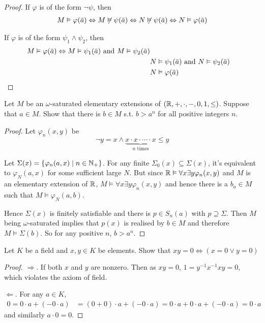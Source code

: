 \documentclass[11pt]{article}
\begin{document}
\begin{proof}
If \(\varphi\) is of the form \(\neg\psi\), then
\begin{align*}
M\vDash\varphi(\bara)\Leftrightarrow M\not\vDash\psi(\bara)\Leftrightarrow N\not\vDash\psi(\bara)\Leftrightarrow N\vDash\varphi(\bara)
\end{align*}

If \(\varphi\) is of the form \(\psi_1\wedge\psi_2\), then
\begin{align*}
M\vDash\varphi(\bara)\Leftrightarrow M\vDash\psi_1(\bara)\text{ and }M\vDash\psi_2(\bara)\\
&N\vDash\psi_1(\bara)\text{ and }N\vDash\psi_2(\bara)\\
&N\vDash\varphi(\bara)
\end{align*}
\end{proof}

\begin{exercise}
Let \(M\) be an \(\omega\)-saturated elementary extensions of \((\mathbb{R},+,\cdot,-,0,1,\le)\). Suppose that \(a\in M\).
Show that there is \(b\in M\) s.t. \(b>a^n\) for all positive integers \(n\).
\end{exercise}

\begin{proof}
Let \(\varphi_n(x,y)\) be
\begin{equation*}
\neg y=x\wedge\underbrace{x\cdot x\cdot\cdots\cdot x}_{n\text{ times}}\le y
\end{equation*}

Let \(\Sigma(x)=\{\varphi_n(a,x)\mid n\in \mathbb{N}_+\}\). For any finite \(\Sigma_0(x)\subseteq\Sigma(x)\), it's equivalent to \(\varphi_N(a,x)\) for
some sufficient large \(N\). But since \(\mathbb{R}\vDash\forall x\exists y\varphi_n(x,y)\) and \(M\) is an elementary extension
of \(\mathbb{R}\), \(M\vDash\forall x\exists y\varphi_n(x,y)\) and hence there is a \(b_a\in M\) such that \(M\vDash\varphi_N(a,b)\).

Hence \(\Sigma(x)\) is finitely satisfiable and there is \(p\in S_n(a)\) with \(p\supseteq\Sigma\). Then \(M\) being
\(\omega\)-saturated implies that \(p(x)\) is realised by \(b\in M\) and therefore \(M\vDash\Sigma(b)\). So for any
positive \(n\), \(b>a^n\).
\end{proof}

\begin{exercise}
Let \(K\) be a field and \(x,y\in K\) be elements. Show that \(xy=0\Leftrightarrow(x=0\vee y=0)\)
\end{exercise}

\begin{proof}
\(\Rightarrow\). If both \(x\) and \(y\) are nonzero. Then as \(xy=0\), \(1=y^{-1}x^{-1}xy=0\), which violates
the axiom of field.

\(\Leftarrow\). For any \(a\in K\),
\begin{align*}
0=0\cdot a+(-0\cdot a)&=(0+0)\cdot a+(-0\cdot a)=0\cdot a+0\cdot a+(-0\cdot a)=0\cdot a
\end{align*}
and similarly \(a\cdot 0=0\).
\end{proof}
\end{document}
